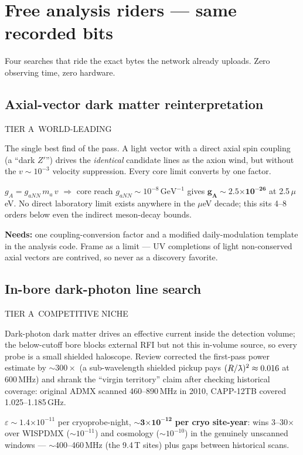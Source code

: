 \documentclass[11pt]{article}
\newcommand{\chip}[3]{\colorbox{#1}{\textcolor{#2}{\scriptsize\textsf{\vphantom{Ag}#3}}}}
\newcommand{\cworld}[1]{\chip{goldsoft}{goldink}{#1}}
\newcommand{\cniche}[1]{\chip{accentsoft}{accentink}{#1}}
\newcommand{\ctier}[1]{\chip{numbg}{inkfaint}{#1}}
\newcommand{\needs}[1]{{\small\textcolor{inkfaint}{\textbf{Needs:} #1}}}
\newcommand{\ueV}{\ensuremath{\mu}eV}
\newcommand{\e}[1]{\ensuremath{\times10^{#1}}}
\newcommand{\lambdabar}{{\mkern0.75mu\mathchar'26\mkern-9.75mu\lambda}}
\begin{document}
\section{Free analysis riders --- same recorded bits}

\noindent Four searches that ride the exact bytes the network already uploads.
Zero observing time, zero hardware.

\subsection{Axial-vector dark matter reinterpretation}
\ctier{TIER A}\ \cworld{WORLD-LEADING}

\medskip\noindent
The single best find of the pass. A light vector with a direct axial spin
coupling (a ``dark $Z'$'') drives the \emph{identical} candidate lines as the
axion wind, but without the $v\sim10^{-3}$ velocity suppression. Every core
limit converts by one factor.

\begin{numbers}\small
$g_A = g_{aNN}\, m_a\, v$ \;$\Rightarrow$\; core reach
$g_{aNN}\sim10^{-8}\,\mathrm{GeV}^{-1}$ gives
$\mathbf{g_A \sim 2.5\e{-26}}$ at 2.5\,\ueV. No direct laboratory limit exists
anywhere in the \ueV{} decade; this sits 4--8 orders below even the indirect
meson-decay bounds.
\end{numbers}

\needs{one coupling-conversion factor and a modified daily-modulation template
in the analysis code. Frame as a limit --- UV completions of light
non-conserved axial vectors are contrived, so never as a discovery favorite.}

\subsection{In-bore dark-photon line search}
\ctier{TIER A}\ \cniche{COMPETITIVE NICHE}

\medskip\noindent
Dark-photon dark matter drives an effective current inside the detection volume;
the below-cutoff bore blocks external RFI but not this in-volume source, so
every probe is a small shielded haloscope. Review corrected the first-pass power
estimate by ${\sim}300\times$ (a sub-wavelength shielded pickup pays
$(R/\lambdabar)^2\approx0.016$ at 600\,MHz) and shrank the ``virgin territory''
claim after checking historical coverage: original ADMX scanned 460--890\,MHz in
2010, CAPP-12TB covered 1.025--1.185\,GHz.

\begin{numbers}\small
$\varepsilon\sim1.4\e{-11}$ per cryoprobe-night,
$\mathbf{{\sim}3\e{-12}}$ \textbf{per cryo site-year}: wins 3--30$\times$ over
WISPDMX (${\sim}10^{-11}$) and cosmology (${\sim}10^{-10}$) in the genuinely
unscanned windows --- ${\sim}$400--460\,MHz (the 9.4\,T sites) plus gaps between
historical scans.
\end{numbers}
\end{document}
